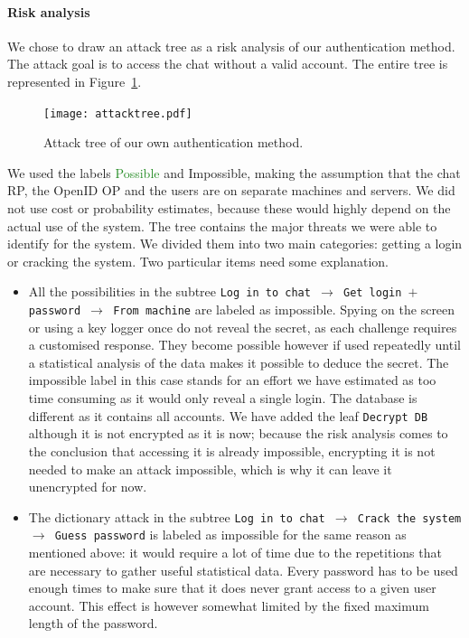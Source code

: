 \documentclass[11pt,a4paper]{article}
\begin{document}
\paragraph{Risk analysis} We chose to draw an attack tree as a risk analysis of our authentication method. The attack goal is to access the chat without a valid account. The entire tree is represented in Figure~\ref{fig:attacktree}.
\begin{figure}[!ht]
\centering
\texttt{[image: attacktree.pdf]}
\caption{Attack tree of our own authentication method.}
\label{fig:attacktree}
\end{figure}
We used the labels \textcolor{ForestGreen}{Possible} and \textcolor{BrickRed}{Impossible}, making the assumption that the chat RP, the OpenID OP and the users are on separate machines and servers. We did not use cost or probability estimates, because these would highly depend on the actual use of the system.
The tree contains the major threats we were able to identify for the system. We divided them into two main categories: getting a login or cracking the system.
Two particular items need some explanation.
\begin{itemize}
\item All the possibilities in the subtree \texttt{Log in to chat $\rightarrow$ Get login $+$ password $\rightarrow$ From machine} are labeled as impossible. Spying on the screen or using a key logger once do not reveal the secret, as each challenge requires a customised response. They become possible however if used repeatedly until a statistical analysis of the data makes it possible to deduce the secret. The impossible label in this case stands for an effort we have estimated as too time consuming as it would only reveal a single login. The database is different as it contains all accounts. We have added the leaf \texttt{Decrypt DB} although it is not encrypted as it is now; because the risk analysis comes to the conclusion that accessing it is already impossible, encrypting it is not needed to make an attack impossible, which is why it can leave it unencrypted for now.
\item The dictionary attack in the subtree \texttt{Log in to chat $\rightarrow$ Crack the system $\rightarrow$ Guess password} is labeled as impossible for the same reason as mentioned above: it would require a lot of time due to the repetitions that are necessary to gather useful statistical data. Every password has to be used enough times to make sure that it does never grant access to a given user account. This effect is however somewhat limited by the fixed maximum length of the password.
\end{itemize}
\end{document}
